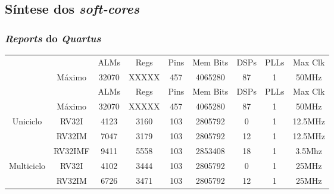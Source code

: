\documentclass[aspectratio=169]{beamer}
\begin{document}
    \subsection{Síntese dos \textit{soft-cores}}
    \begin{frame}
        \frametitle{\textit{Reports} do \textit{Quartus}}
        \vfill
        \begin{footnotesize}
        \begin{longtable}{cc|c|c|c|c|c|c|c|}
            \cline{3-9}
                                                                    &                               & ALMs  & Regs  & Pins  & Mem Bits  & DSPs  & PLLs  & Max Clk   \\
            \cline{2-9}
                                                                    & \multicolumn{1}{|c|}{Máximo}  & 32070 & XXXXX & 457   & 4065280   & 87    & 1     & 50MHz     \\
            \hline
            \endfirsthead
            \cline{3-9}
                                                                    &                               & ALMs  & Regs  & Pins  & Mem Bits  & DSPs  & PLLs  & Max Clk   \\
            \cline{2-9}
                                                                    & \multicolumn{1}{|c|}{Máximo}  & 32070 & XXXXX & 457   & 4065280   & 87    & 1     & 50MHz     \\
            \hline
            \endhead
            \multicolumn{1}{|c}{\multirow{3}{*}{{Uniciclo}}}        & \multicolumn{1}{|c|}{RV32I}   & 4123  & 3160  & 103   & 2805792   & 0     & 1     & 12.5MHz   \\*
            \cline{2-9}
            \multicolumn{1}{|c}{ }                                  & \multicolumn{1}{|c|}{RV32IM}  & 7047  & 3179  & 103   & 2805792   & 12    & 1     & 12.5MHz   \\*
            \cline{2-9}
            \multicolumn{1}{|c}{ }                                  & \multicolumn{1}{|c|}{RV32IMF} & 9411  & 5558  & 103   & 2853408   & 18    & 1     & 3.5Mhz    \\
            \hline
            \multicolumn{1}{|c}{\multirow{3}{*}{{Multiciclo}}}      & \multicolumn{1}{|c|}{RV32I}   & 4102  & 3444  & 103   & 2805792   & 0     & 1     & 25MHz     \\*
            \cline{2-9}
            \multicolumn{1}{|c}{ }                                  & \multicolumn{1}{|c|}{RV32IM}  & 6726  & 3471  & 103   & 2805792   & 12    & 1     & 25MHz     \\*

\end{longtable}
\end{footnotesize}
\end{frame}
\end{document}
